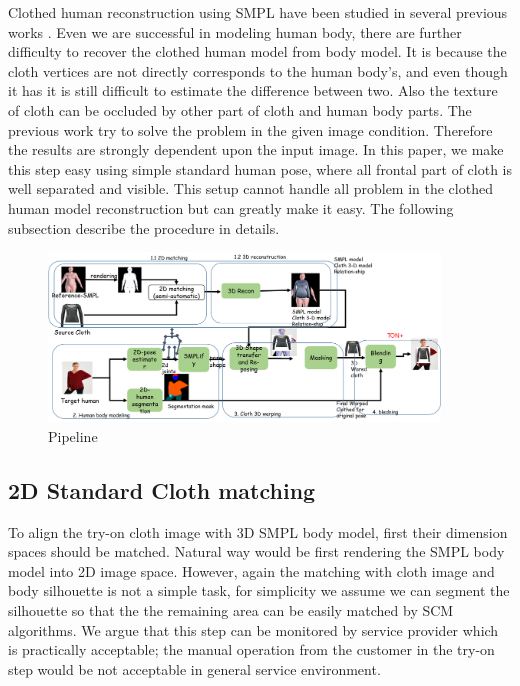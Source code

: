 \documentclass[runningheads]{llncs}
\begin{document}
Clothed human reconstruction using SMPL have been studied in several previous works \cite{Weng2018PhotoW3,Zanfir2018HumanAT}.
Even we are successful in modeling human body, there are further difficulty to recover the clothed human model from body model. It is because the cloth vertices are not directly corresponds to the human body's, and even though it has it is still difficult to estimate the difference between two. Also the texture of cloth can be occluded by other part of cloth and human body parts. The previous work try to solve the problem in the given image condition. Therefore the results are strongly dependent upon the input image.
In this paper, we make this step easy using simple standard human pose, where all frontal part of cloth is well separated and visible. This setup cannot handle all problem in the clothed human model reconstruction but can greatly make it easy.   
The following subsection describe the procedure in details.


\begin{figure}
\centering
\includegraphics[height=4.5cm, scale=1]{figures/pipeline.png}   %
\caption{Pipeline}
\label{fig:piepline}
\end{figure}

\subsection{2D Standard Cloth matching}


To align the try-on cloth image with 3D SMPL body model\cite{Loper2015SMPLAS}, first their dimension spaces should be matched. Natural way would be first rendering the SMPL body model into 2D image space. However, again the matching with cloth image and body silhouette is not a simple task, for simplicity we assume we can segment the silhouette so that the the remaining area can be easily matched by SCM algorithms. We argue that this step can be monitored by service provider which is practically acceptable; the manual operation from the customer in the try-on step would be not acceptable in general service environment.   
\end{document}
